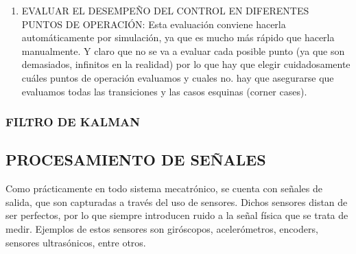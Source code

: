 \documentclass{article}
\begin{document}
\begin{sloppypar}
\begin{enumerate}
    \item EVALUAR EL DESEMPEÑO DEL CONTROL EN DIFERENTES PUNTOS DE OPERACIÓN:
Esta evaluación conviene hacerla automáticamente por simulación, ya que es mucho más rápido que hacerla manualmente. Y claro que no se va a evaluar cada posible punto (ya que son demasiados, infinitos en la realidad) por lo que hay que elegir cuidadosamente cuáles puntos de operación evaluamos y cuales no. hay que asegurarse que evaluamos todas las transiciones y las casos esquinas (corner cases).
\end{enumerate}

























\subsubsection{FILTRO DE KALMAN}
\label{sec:FILTRO DE KALMAN}


\subsection{PROCESAMIENTO DE SEÑALES}
\label{sec:PROCESAMIENTO DE SEÑALES}

Como prácticamente en todo sistema mecatrónico, se cuenta con señales de salida, que son capturadas a través del uso de sensores. Dichos sensores distan de ser perfectos, por lo que siempre introducen ruido a la señal física que se trata de medir. Ejemplos de estos sensores son giróscopos, acelerómetros, encoders, sensores ultrasónicos, entre otros.


\end{sloppypar}
\end{document}
